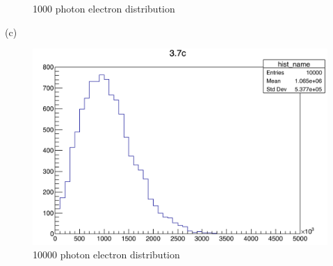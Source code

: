 \documentclass{article}
\begin{document}
\begin{CJK*}{GBK}{song}
\begin{figure}[H]
\caption{1000 photon electron distribution}
\label{fig:label}
\end{figure}

(c)
\begin{figure}[H]
\centerline{\includegraphics[scale=0.4]{3.7c.png}}
\caption{10000 photon electron distribution}
\label{fig:label}
\end{figure}












\end{CJK*}
\end{document}
